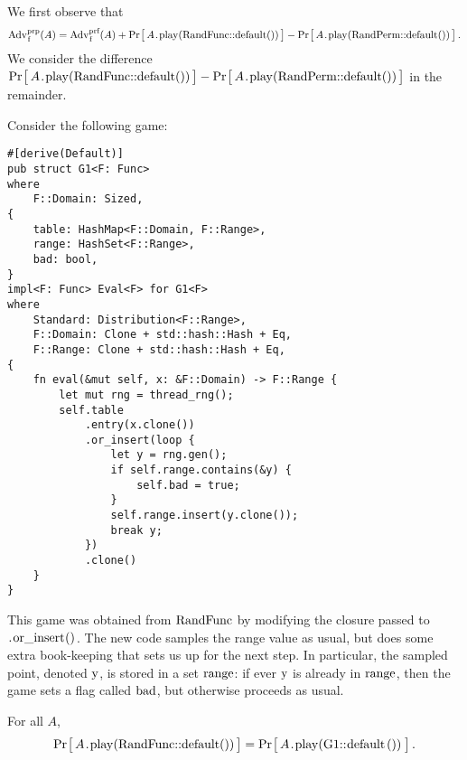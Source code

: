 We first observe that
%
\[
  \Adv{prp}_\code{f}(A) =
      \Adv{prf}_\code{f}(A) +
      \Prob{A\code{.play(RandFunc::default())}} -
      \Prob{A\code{.play(RandPerm::default())}} \,.
\]
%
We consider the difference $\Prob{A\code{.play(RandFunc::default())}} -
\Prob{A\code{.play(RandPerm::default())}}$ in the remainder.

Consider the following game:
%
\begin{lstlisting}
#[derive(Default)]
pub struct G1<F: Func>
where
    F::Domain: Sized,
{
    table: HashMap<F::Domain, F::Range>,
    range: HashSet<F::Range>,
    bad: bool,
}
impl<F: Func> Eval<F> for G1<F>
where
    Standard: Distribution<F::Range>,
    F::Domain: Clone + std::hash::Hash + Eq,
    F::Range: Clone + std::hash::Hash + Eq,
{
    fn eval(&mut self, x: &F::Domain) -> F::Range {
        let mut rng = thread_rng();
        self.table
            .entry(x.clone())
            .or_insert(loop {
                let y = rng.gen();
                if self.range.contains(&y) {
                    self.bad = true;
                }
                self.range.insert(y.clone());
                break y;
            })
            .clone()
    }
}
\end{lstlisting}
%
This game was obtained from \hyperref[sec/func/ideal]{$\code{RandFunc}$} by
modifying the closure passed to $\code{.or_insert()}$. The new code samples the
range value as usual, but does some extra book-keeping that sets us up for the
next step. In particular, the sampled point, denoted $\code{y}$, is stored in a
set $\code{range}$: if ever $\code{y}$ is already in $\code{range}$, then the
game sets a flag called $\code{bad}$, but otherwise proceeds as usual.

\begin{claim}
  For all $A$,
  \[
     \Prob{A\code{.play(RandFunc::default())}} =
     \Prob{A\code{.play(G1::default())}} \,.
  \]
\end{claim}
%


